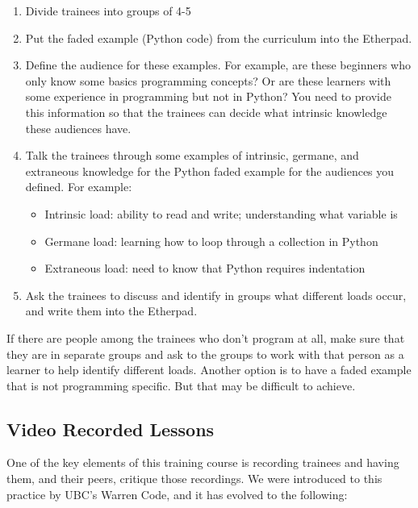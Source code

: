 \begin{itemize}
  \begin{enumerate}
  \def\labelenumi{\arabic{enumi}.}
  \itemsep1pt\parskip0pt
  \item
    Divide trainees into groups of 4-5
  \item
    Put the faded example (Python code) from the curriculum into the
    Etherpad.
  \item
    Define the audience for these examples. For example, are these
    beginners who only know some basics programming concepts? Or are
    these learners with some experience in programming but not in
    Python? You need to provide this information so that the trainees
    can decide what intrinsic knowledge these audiences have.
  \item
    Talk the trainees through some examples of intrinsic, germane, and
    extraneous knowledge for the Python faded example for the audiences
    you defined. For example:

    \begin{itemize}
    \itemsep1pt\parskip0pt
    \item
      Intrinsic load: ability to read and write; understanding what
      variable is
    \item
      Germane load: learning how to loop through a collection in Python
    \item
      Extraneous load: need to know that Python requires indentation
    \end{itemize}
  \item
    Ask the trainees to discuss and identify in groups what different
    loads occur, and write them into the Etherpad.
  \end{enumerate}

  If there are people among the trainees who don't program at all, make
  sure that they are in separate groups and ask to the groups to work
  with that person as a learner to help identify different loads.
  Another option is to have a faded example that is not programming
  specific. But that may be difficult to achieve.
\end{itemize}

\subsection{Video Recorded Lessons}\label{video-recorded-lessons}

One of the key elements of this training course is recording trainees
and having them, and their peers, critique those recordings. We were
introduced to this practice by UBC's Warren Code, and it has evolved to
the following:

